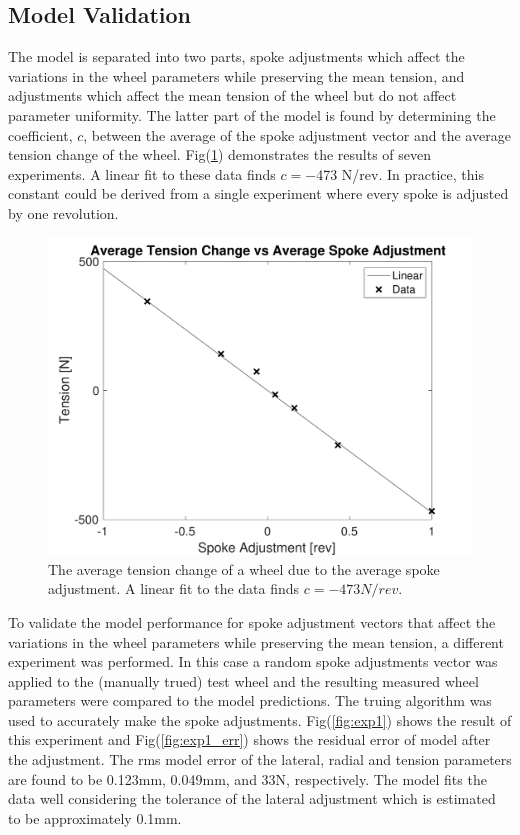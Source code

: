 \documentclass[journal]{IEEEtran}
\begin{document}
\subsection{Model Validation}
The model is separated into two parts, spoke adjustments which affect the variations in the wheel parameters while preserving the mean tension, and adjustments which affect the mean tension of the wheel but do not affect parameter uniformity.  The latter part of the model is found by determining the coefficient, $c$, between the average of the spoke adjustment vector and the average tension change of the wheel.  Fig(\ref{fig:c}) demonstrates the results of seven experiments. A linear fit to these data finds $c=-$473 N/rev. In practice, this constant could be derived from a single experiment where every spoke is adjusted by one revolution. 

 \begin{figure}[!t]
\centering
\includegraphics[width=3.25 in]{./figs/c}
\caption{The average tension change of a wheel due to the average spoke adjustment. A linear fit to the data finds $c=-473 N/rev$.}
\label{fig:c}
\end{figure}

To validate the model performance for spoke adjustment vectors that affect the variations in the wheel parameters while preserving the mean tension, a different experiment was performed.  In this case a random spoke adjustments vector was applied to the (manually trued) test wheel and the resulting measured wheel parameters were compared to the model predictions. The truing algorithm was used to accurately make the spoke adjustments.  Fig(\ref{fig:exp1}) shows the result of this experiment and Fig(\ref{fig:exp1_err}) shows the residual error of model after the adjustment. The rms model error of the lateral, radial and tension parameters are found to be 0.123mm, 0.049mm, and 33N, respectively.  The model fits the data well considering the tolerance of the lateral adjustment which is estimated to be approximately 0.1mm.
\end{document}
